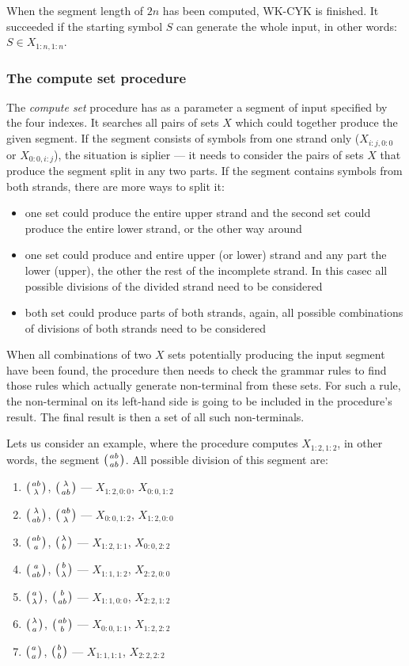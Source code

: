 When the segment length of $2n$ has been computed, WK-CYK is finished. It succeeded if the starting symbol $S$ can generate the whole input, in other words: $S \in X_{1:n,1:n}$.

\subsubsection{The compute set procedure}
The \textit{compute set} procedure has as a parameter a segment of input specified by the four indexes. It searches all pairs of sets $X$ which could together produce the given segment. If the segment consists of symbols from one strand only ($X_{i:j,0:0}$ or $X_{0:0,i:j}$), the situation is siplier --- it needs to consider the pairs of sets $X$ that produce the segment split in any two parts. If the segment contains symbols from both strands, there are more ways to split it:

\begin{itemize}
  \item{one set could produce the entire upper strand and the second set could produce the entire lower strand, or the other way around}
  \item{one set could produce and entire upper (or lower) strand and any part the lower (upper), the other the rest of the incomplete strand. In this casec all possible divisions of the divided strand need to be considered}
  \item{both set could produce parts of both strands, again, all possible combinations of divisions of both strands need to be considered}
\end{itemize}

When all combinations of two $X$ sets potentially producing the input segment have been found, the procedure then needs to check the grammar rules to find those rules which actually generate non-terminal from these sets. For such a rule, the non-terminal on its left-hand side is going to be included in the procedure's result. The final result is then a set of all such non-terminals.

Lets us consider an example, where the procedure computes $X_{1:2,1:2}$, in other words, the segment $\wkpair{ab}{ab}$. All possible division of this segment are:

\begin{enumerate}
  \item{$\wkpair{ab}{\lambda}$, $\wkpair{\lambda}{ab}$ --- $X_{1:2,0:0}$, $X_{0:0,1:2}$}
  \item{$\wkpair{\lambda}{ab}$, $\wkpair{ab}{\lambda}$ --- $X_{0:0,1:2}$, $X_{1:2,0:0}$}
  \item{$\wkpair{ab}{a}$, $\wkpair{\lambda}{b}$ --- $X_{1:2,1:1}$, $X_{0:0,2:2}$}
  \item{$\wkpair{a}{ab}$, $\wkpair{b}{\lambda}$ --- $X_{1:1,1:2}$, $X_{2:2,0:0}$}
  \item{$\wkpair{a}{\lambda}$, $\wkpair{b}{ab}$ --- $X_{1:1,0:0}$, $X_{2:2,1:2}$}
  \item{$\wkpair{\lambda}{a}$, $\wkpair{ab}{b}$ --- $X_{0:0,1:1}$, $X_{1:2,2:2}$}
  \item{$\wkpair{a}{a}$, $\wkpair{b}{b}$ --- $X_{1:1,1:1}$, $X_{2:2,2:2}$}
\end{enumerate}

